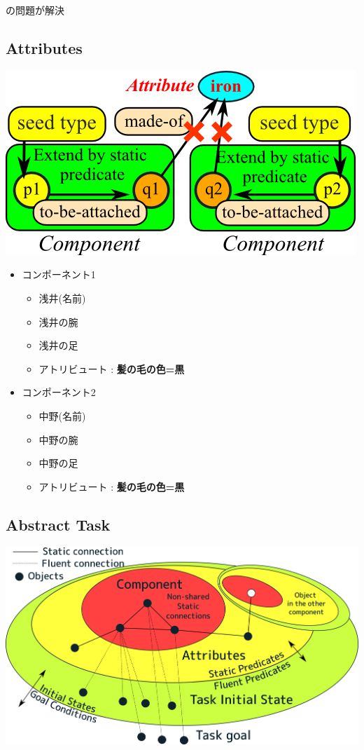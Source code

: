 の問題が解決

\subsection{Attributes}
\label{sec-2-4}

\includegraphics[width=.9\linewidth]{img/abstract-component.png}

\begin{itemize}
\item コンポーネント1
\begin{itemize}
\item 浅井(名前)
\item 浅井の腕
\item 浅井の足
\item アトリビュート : \textbf{髪の毛の色=黒}
\end{itemize}
\item コンポーネント2
\begin{itemize}
\item 中野(名前)
\item 中野の腕
\item 中野の足
\item アトリビュート : \textbf{髪の毛の色=黒}
\end{itemize}
\end{itemize}

\subsection{Abstract Task}
\label{sec-2-5}

\includegraphics[width=.9\linewidth]{img/abstract-task.png}

